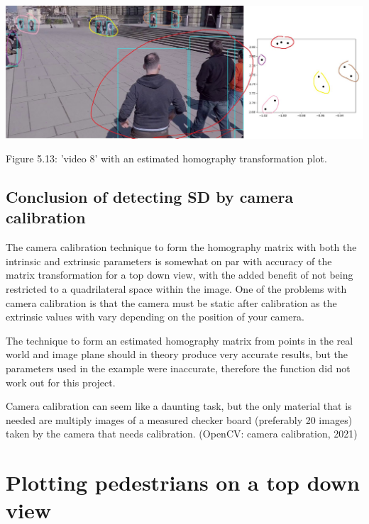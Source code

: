 \documentclass[12pt]{report}
\begin{document}
\begin{center}
	\includegraphics[width=150mm]{./images/appendix/EstimatedHomographyP.JPG}
	
	{\footnotesize Figure 5.13: 'video 8' with an estimated homography transformation plot.}
\end{center}

\subsection*{Conclusion of detecting SD by camera calibration}

The camera calibration technique to form the homography matrix with both the intrinsic and extrinsic parameters is somewhat on par with accuracy of the matrix transformation for a top down view, with the added benefit of not being restricted to a quadrilateral space within the image. One of the problems with camera calibration is that the camera must be static after calibration as the extrinsic values with vary depending on the position of your camera.

\vspace{2mm}

The technique to form an estimated homography matrix from points in the real world and image plane should in theory produce very accurate results, but the parameters used in the example were inaccurate, therefore the function did not work out for this project.

\vspace{2mm}

Camera calibration can seem like a daunting task, but the only material that is needed are multiply images of a measured checker board (preferably 20 images) taken by the camera that needs calibration. (OpenCV: camera calibration, 2021)

\section{Plotting pedestrians on a top down view}
\end{document}
